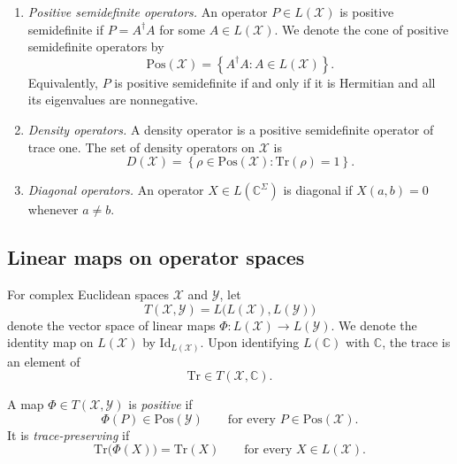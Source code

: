 \documentclass[
    aps,
    pra,
    reprint,
    superscriptaddress,
    nofootinbib
]{revtex4-2}
\theoremstyle{definition}
\theoremstyle{plain}
\begin{document}
\begin{enumerate}
    \item \emph{Positive semidefinite operators.}
    An operator $P\in L(\mathcal{X})$ is positive semidefinite if
    $P=A^\dagger A$ for some $A\in L(\mathcal{X})$. We denote the cone of
    positive semidefinite operators by
    \begin{equation}
        \mathrm{Pos}(\mathcal{X})
        =
        \left\{A^\dagger A:A\in L(\mathcal{X})\right\}.
    \end{equation}
    Equivalently, $P$ is positive semidefinite if and only if it is Hermitian
    and all its eigenvalues are nonnegative.

    \item \emph{Density operators.}
    A density operator is a positive semidefinite operator of trace one. The
    set of density operators on $\mathcal{X}$ is
    \begin{equation}
        D(\mathcal{X})
        =
        \left\{\rho\in\mathrm{Pos}(\mathcal{X}):
        \mathrm{Tr}(\rho)=1\right\}.
    \end{equation}

    \item \emph{Diagonal operators.}
    An operator $X\in L(\mathbb{C}^{\Sigma})$ is diagonal if $X(a,b)=0$
    whenever $a\neq b$.
\end{enumerate}

\subsection{Linear maps on operator spaces}

For complex Euclidean spaces $\mathcal{X}$ and $\mathcal{Y}$, let
\begin{equation}
    T(\mathcal{X},\mathcal{Y})
    =
    L\bigl(L(\mathcal{X}),L(\mathcal{Y})\bigr)
\end{equation}
denote the vector space of linear maps
$\Phi:L(\mathcal{X})\to L(\mathcal{Y})$. We denote the identity map on
$L(\mathcal{X})$ by $\mathrm{Id}_{L(\mathcal{X})}$. Upon identifying
$L(\mathbb{C})$ with $\mathbb{C}$, the trace is an element of
\begin{equation}
    \mathrm{Tr}\in T(\mathcal{X},\mathbb{C}).
\end{equation}

A map $\Phi\in T(\mathcal{X},\mathcal{Y})$ is \emph{positive} if
\begin{equation}
    \Phi(P)\in\mathrm{Pos}(\mathcal{Y})
    \qquad\text{for every }P\in\mathrm{Pos}(\mathcal{X}).
\end{equation}
It is \emph{trace-preserving} if
\begin{equation}
    \mathrm{Tr}\bigl(\Phi(X)\bigr)=\mathrm{Tr}(X)
    \qquad\text{for every }X\in L(\mathcal{X}).
\end{equation}
\end{document}
